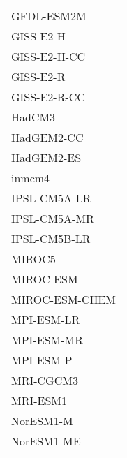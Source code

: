 \documentclass{ametsocV5}
\begin{document}
\begin{table}[t]
\begin{center}
\begin{tabular}{ l }
    GFDL-ESM2M      \\%
    GISS-E2-H       \\%
    GISS-E2-H-CC    \\%
    GISS-E2-R       \\%
    GISS-E2-R-CC    \\%
    HadCM3          \\%
    HadGEM2-CC      \\%
    HadGEM2-ES      \\%
    inmcm4          \\%
    IPSL-CM5A-LR    \\%
    IPSL-CM5A-MR    \\%
    IPSL-CM5B-LR    \\%
    MIROC5          \\%
    MIROC-ESM       \\%
    MIROC-ESM-CHEM  \\%
    MPI-ESM-LR      \\%
    MPI-ESM-MR      \\%
    MPI-ESM-P       \\%
    MRI-CGCM3       \\%
    MRI-ESM1        \\%
    NorESM1-M       \\%
    NorESM1-ME      \\%

  \end{tabular}
\end{center}
\end{table}
\end{document}
